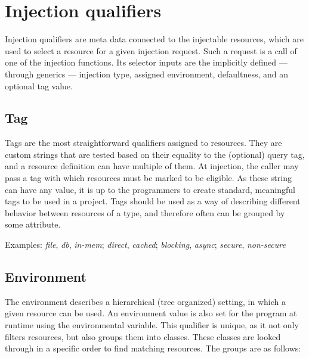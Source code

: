 	\section{Injection qualifiers}
	
		Injection qualifiers are meta data connected to the injectable resources, which are used to select a resource for a given injection request. Such a request is a call of one of the injection functions. Its selector inputs are the implicitly defined --- through generics --- injection type, assigned environment, defaultness, and an optional tag value.
	
		\subsection*{Tag}
	
		Tags are the most straightforward qualifiers assigned to resources. They are custom strings that are tested based on their equality to the (optional) query tag, and a resource definition can have multiple of them. At injection, the caller may pass a tag with which resources must be marked to be eligible. As these string can have any value, it is up to the programmers to create standard, meaningful tags to be used in a project. Tags should be used as a way of describing different behavior between resources of a type, and therefore often can be grouped by some attribute.
		
		Examples: \emph{file}, \emph{db}, \emph{in-mem};
		\emph{direct}, \emph{cached};
		\emph{blocking}, \emph{async};
		\emph{secure}, \emph{non-secure}
	
		\subsection*{Environment}

		The environment describes a hierarchical (tree organized) setting, in which a given resource can be used. An environment value is also set for the program at runtime using the  environmental variable. This qualifier is unique, as it not only filters resources, but also groups them into classes. These classes are looked through in a specific order to find matching resources. The groups are as follows:
		
